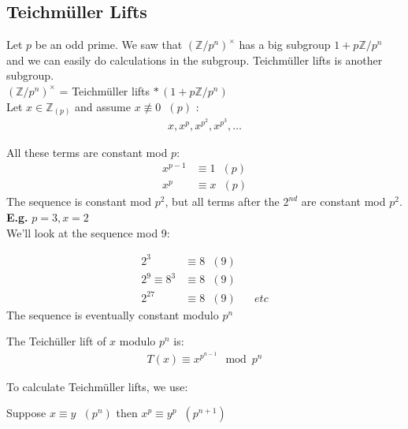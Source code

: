 \documentclass[11pt]{article}
\begin{document}
\newpage
\subsection{Teichm\"uller Lifts}
Let $p$ be an odd prime. We saw that $(\mathbb{Z}/p^n)^\times$ has a big subgroup $1+p\mathbb{Z}/p^n$ and we can easily do calculations in the subgroup. Teichm\"uller lifts is another subgroup.\\[1em]
$(\mathbb{Z}/p^n)^\times$ = Teichm\"uller lifts $* \hspace{2pt} (1+p\mathbb{Z}/p^n)$ \\[1em]

Let $x \in \mathbb{Z}_{(p)} $ and assume $x\not \equiv 0 \hspace{7pt} (p)$ :
\begin{align*}
x, x^p, x^{p^2}, x^{p^3}, \dots
\end{align*}

All these terms are constant mod $p$: 
\begin{align*}
	x^{p-1} &\equiv 1 \hspace{7pt} (p)\\
	x^p &\equiv x \hspace{7pt} (p) 
\end{align*}
The sequence is constant mod $p^2$, but all terms after the $2^{nd}$ are constant mod $p^2$.\\[0.5em]
\textbf{E.g.} $p=3, x=2$\\[0.5em]
We'll look at the sequence mod 9:

\begin{align*}
	2^3 &\equiv 8 \hspace{7pt} (9)\\
	2^9 \equiv 8^3 &\equiv 8 \hspace{7pt} (9) \\
	2^{27} &\equiv 8 \hspace{7pt} (9) \hspace{20pt}  etc
\end{align*}
The sequence is eventually constant modulo $p^n$


\begin{definition}
	The Teich\"uller lift of $x$ modulo $p^n$ is: 
	\begin{align*}
		T(x) \equiv x^{p^{n-1}} \mod p^n
	\end{align*}
\end{definition}

To calculate Teichm\"uller lifts, we use:

\begin{lemma}
	Suppose $x \equiv y \hspace{7pt} (p^n)$ then $x^p \equiv y^p\hspace{7pt} (p^{n+1})$
\end{lemma}
\end{document}
